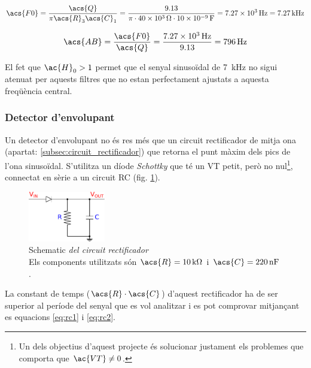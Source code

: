 \begin{equation}
\acs{F0} = \frac{\acs{Q}}{\pi \acs{R}_3\acs{C}_1} = \frac{\num{9.13}}{\pi\cdot\SI{40e3}{\ohm}\cdot\SI{10e-9}{\farad}} = \SI{7.27e3}{\hertz} = \SI{7.27}{\kilo\hertz}
\end{equation}

\begin{equation}
\acs{AB} = \frac{\acs{F0}}{\acs{Q}} = \frac{\SI{7.27e3}{\hertz}}{\num{9.13}} = \SI{796}{\hertz}
\end{equation}

El fet que $ \ac{H}_0 > \num{1} $ permet que el senyal sinusoïdal de \SI{7}{\kilo\hertz} no sigui atenuat per aquests filtres que no estan perfectament ajustats a aquesta freqüència central.

\subsubsection{Detector d'envolupant}

Un detector d'envolupant no és res més que un circuit rectificador de mitja ona (apartat: \ref{subsec:circuit_rectificador}) que retorna el punt màxim dels pics de l'ona sinusoïdal. S'utilitza un díode \textit{Schottky} que té un \ac{VT} petit, però no nul\footnote{Un dels objectius d'aquest projecte és solucionar justament els problemes que comporta que $ \ac{VT} \neq 0 $.}, connectat en sèrie a un circuit \ac{RC} (fig. \ref{fig:schematic_rectificador_1}).

\begin{figure}[htp]
	\centering
	\includegraphics[width=0.3\textwidth]{Figures/schematic_rectificador_1.pdf}
	\caption[Circuit rectificador]{Schematic\textit{ del circuit rectificador}\\{\footnotesize Els components utilitzats són $ \acs{R} = \SI{10}{\kilo\ohm} $ i $ \acs{C} = \SI{220}{\nano\farad} $.}}
	\label{fig:schematic_rectificador_1}
\end{figure}

La constant de temps ($ \acs{R}\cdot\acs{C} $) d'aquest rectificador ha de ser superior al període del senyal que es vol analitzar i es pot comprovar mitjançant es equacions \ref{eq:rc1} i \ref{eq:rc2}.

